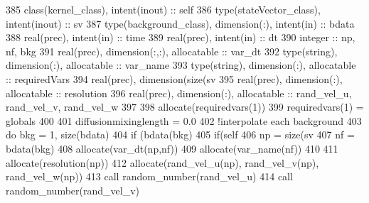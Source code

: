 \begin{DoxyCode}
385     \textcolor{keywordtype}{class}(kernel\_class), \textcolor{keywordtype}{intent(inout)} :: self
386     \textcolor{keywordtype}{type}(stateVector\_class), \textcolor{keywordtype}{intent(inout)} :: sv
387     \textcolor{keywordtype}{type}(background\_class), \textcolor{keywordtype}{dimension(:)}, \textcolor{keywordtype}{intent(in)} :: bdata
388     \textcolor{keywordtype}{real(prec)}, \textcolor{keywordtype}{intent(in)} :: time
389     \textcolor{keywordtype}{real(prec)}, \textcolor{keywordtype}{intent(in)} :: dt
390     \textcolor{keywordtype}{integer} :: np, nf, bkg
391     \textcolor{keywordtype}{real(prec)}, \textcolor{keywordtype}{dimension(:,:)}, \textcolor{keywordtype}{allocatable} :: var\_dt
392     \textcolor{keywordtype}{type}(string), \textcolor{keywordtype}{dimension(:)}, \textcolor{keywordtype}{allocatable} :: var\_name
393     \textcolor{keywordtype}{type}(string), \textcolor{keywordtype}{dimension(:)}, \textcolor{keywordtype}{allocatable} :: requiredVars
394     \textcolor{keywordtype}{real(prec)}, \textcolor{keywordtype}{dimension(size(sv%
395     \textcolor{keywordtype}{real(prec)}, \textcolor{keywordtype}{dimension(:)}, \textcolor{keywordtype}{allocatable} :: resolution
396     \textcolor{keywordtype}{real(prec)}, \textcolor{keywordtype}{dimension(:)}, \textcolor{keywordtype}{allocatable} :: rand\_vel\_u, rand\_vel\_v, rand\_vel\_w
397 
398     \textcolor{keyword}{allocate}(requiredvars(1))
399     requiredvars(1) = globals%
400 
401     diffusionmixinglength = 0.0
402     \textcolor{comment}{!interpolate each background}
403     \textcolor{keywordflow}{do} bkg = 1, \textcolor{keyword}{size}(bdata)
404         \textcolor{keywordflow}{if} (bdata(bkg)%
405             \textcolor{keywordflow}{if}(self%
406                 np = \textcolor{keyword}{size}(sv%
407                 nf = bdata(bkg)%
408                 \textcolor{keyword}{allocate}(var\_dt(np,nf))
409                 \textcolor{keyword}{allocate}(var\_name(nf))
410 
411                 \textcolor{keyword}{allocate}(resolution(np))
412                 \textcolor{keyword}{allocate}(rand\_vel\_u(np), rand\_vel\_v(np), rand\_vel\_w(np))
413                 \textcolor{keyword}{call }random\_number(rand\_vel\_u)
414                 \textcolor{keyword}{call }random\_number(rand\_vel\_v)
}
\end{DoxyCode}
